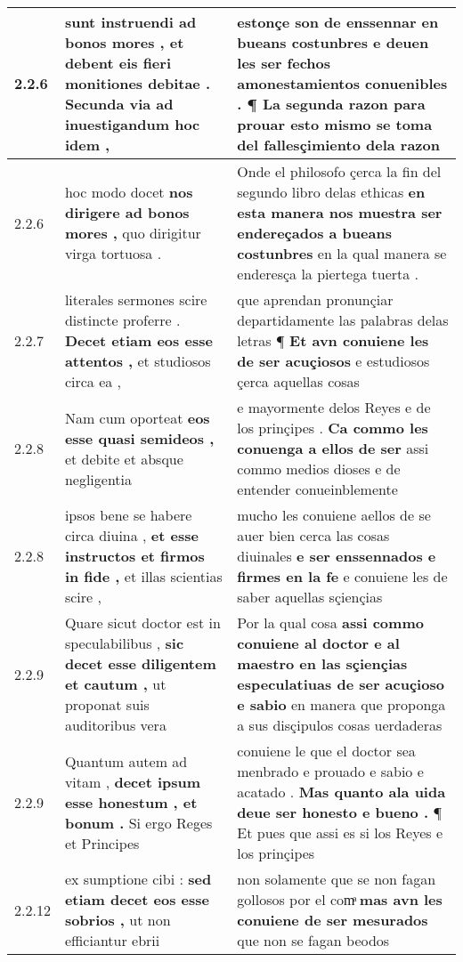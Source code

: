\begin{tabular}{|p{1cm}|p{6.5cm}|p{6.5cm}|}
2.2.6 & sunt instruendi ad bonos mores , \textbf{ et debent eis fieri monitiones debitae . } Secunda via ad inuestigandum hoc idem , & estonçe son de enssennar en bueans costunbres \textbf{ e deuen les ser fechos amonestamientos conuenibles . } ¶ La segunda razon para prouar esto mismo se toma del fallesçimiento dela razon \\\hline
2.2.6 & hoc modo docet \textbf{ nos dirigere ad bonos mores , } quo dirigitur virga tortuosa . & Onde el philosofo çerca la fin del segundo libro delas ethicas \textbf{ en esta manera nos muestra ser endereçados a bueans costunbres } en la qual manera se enderesça la piertega tuerta . \\\hline
2.2.7 & literales sermones scire distincte proferre . \textbf{ Decet etiam eos esse attentos , } et studiosos circa ea , & que aprendan pronunçiar departidamente las palabras delas letras ¶ \textbf{ Et avn conuiene les de ser acuçiosos } e estudiosos çerca aquellas cosas \\\hline
2.2.8 & Nam cum oporteat \textbf{ eos esse quasi semideos , } et debite et absque negligentia & e mayormente delos Reyes e de los prinçipes . \textbf{ Ca commo les conuenga a ellos de ser } assi commo medios dioses e de entender conueinblemente \\\hline
2.2.8 & ipsos bene se habere circa diuina , \textbf{ et esse instructos et firmos in fide , } et illas scientias scire , & mucho les conuiene aellos de se auer bien cerca las cosas diuinales \textbf{ e ser enssennados e firmes en la fe } e conuiene les de saber aquellas sçiençias \\\hline
2.2.9 & Quare sicut doctor est in speculabilibus , \textbf{ sic decet esse diligentem et cautum , } ut proponat suis auditoribus vera & Por la qual cosa \textbf{ assi commo conuiene al doctor e al maestro en las sçiençias especulatiuas de ser acuçioso e sabio } en manera que proponga a sus disçipulos cosas uerdaderas \\\hline
2.2.9 & Quantum autem ad vitam , \textbf{ decet ipsum esse honestum , et bonum . } Si ergo Reges et Principes & conuiene le que el doctor sea menbrado e prouado e sabio e acatado . \textbf{ Mas quanto ala uida deue ser honesto e bueno . } ¶ Et pues que assi es si los Reyes e los prinçipes \\\hline
2.2.12 & ex sumptione cibi : \textbf{ sed etiam decet eos esse sobrios , } ut non efficiantur ebrii & non solamente que se non fagan gollosos por el comͣ \textbf{ mas avn les conuiene de ser mesurados } que non se fagan beodos \\\hline

\end{tabular}
